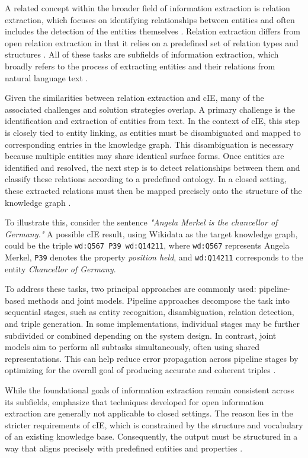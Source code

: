 \documentclass[a4paper,oneside,bibliography=totoc]{scrbook}
\begin{document}
A related concept within the broader field of information extraction is relation extraction, which focuses on identifying relationships between entities and often includes the detection of the entities themselves \cite{Zhao2024}. Relation extraction differs from open relation extraction in that it relies on a predefined set of relation types and structures \cite{Kamp2023}. All of these tasks are subfields of information extraction, which broadly refers to the process of extracting entities and their relations from natural language text \cite{Etzioni2008}.

Given the similarities between relation extraction and \ac{cIE}, many of the associated challenges and solution strategies overlap. A primary challenge is the identification and extraction of entities from text. In the context of \ac{cIE}, this step is closely tied to entity linking, as entities must be disambiguated and mapped to corresponding entries in the knowledge graph. This disambiguation is necessary because multiple entities may share identical surface forms. Once entities are identified and resolved, the next step is to detect relationships between them and classify these relations according to a predefined ontology. In a closed setting, these extracted relations must then be mapped precisely onto the structure of the knowledge graph \cite{Josifoski2021,Zhao2024}.

To illustrate this, consider the sentence \textit{"Angela Merkel is the chancellor of Germany."} A possible \ac{cIE} result, using Wikidata as the target knowledge graph, could be the triple \texttt{wd:Q567\ P39\ wd:Q14211}, where \texttt{wd:Q567} represents Angela Merkel, \texttt{P39} denotes the property \textit{position held}, and \texttt{wd:Q14211} corresponds to the entity \textit{Chancellor of Germany}.

To address these tasks, two principal approaches are commonly used: pipeline-based methods and joint models. Pipeline approaches decompose the task into sequential stages, such as entity recognition, disambiguation, relation detection, and triple generation. In some implementations, individual stages may be further subdivided or combined depending on the system design. In contrast, joint models aim to perform all subtasks simultaneously, often using shared representations. This can help reduce error propagation across pipeline stages by optimizing for the overall goal of producing accurate and coherent triples \cite{Zhao2024,Josifoski2021}.

While the foundational goals of information extraction remain consistent across its subfields, \citet{Josifoski2021} emphasize that techniques developed for open information extraction are generally not applicable to closed settings. The reason lies in the stricter requirements of \ac{cIE}, which is constrained by the structure and vocabulary of an existing knowledge base. Consequently, the output must be structured in a way that aligns precisely with predefined entities and properties \cite{Josifoski2021}.
\end{document}
